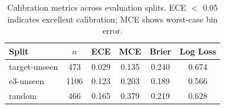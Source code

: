 \begin{table}[t]
\centering
\caption{Calibration metrics across evaluation splits. ECE $<$ 0.05 indicates excellent calibration; MCE shows worst-case bin error.}
\label{tab:calibration}
\small
\begin{tabular}{@{}lccccc@{}}
\toprule
\textbf{Split} & \textbf{$n$} & \textbf{ECE} & \textbf{MCE} & \textbf{Brier} & \textbf{Log Loss} \\
\midrule
target-unseen & 473 & 0.029 & 0.135 & 0.240 & 0.674 \\
e3-unseen & 1106 & 0.123 & 0.203 & 0.189 & 0.566 \\
random & 466 & 0.165 & 0.379 & 0.219 & 0.628 \\
\bottomrule
\end{tabular}
\end{table}
